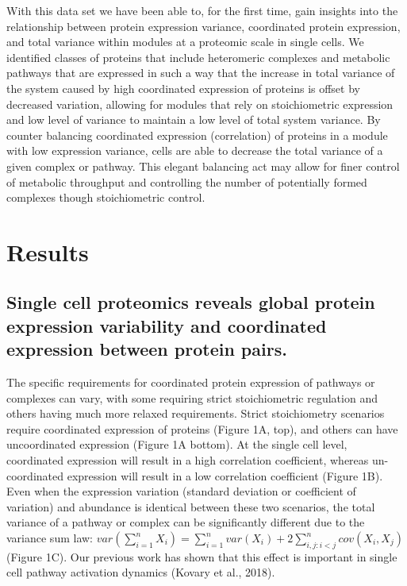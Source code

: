\documentclass[11pt,]{article}
\begin{document}
With this data set we have been able to, for the first time, gain
insights into the relationship between protein expression variance,
coordinated protein expression, and total variance within modules at a
proteomic scale in single cells. We identified classes of proteins that
include heteromeric complexes and metabolic pathways that are expressed
in such a way that the increase in total variance of the system caused
by high coordinated expression of proteins is offset by decreased
variation, allowing for modules that rely on stoichiometric expression
and low level of variance to maintain a low level of total system
variance. By counter balancing coordinated expression (correlation) of
proteins in a module with low expression variance, cells are able to
decrease the total variance of a given complex or pathway. This elegant
balancing act may allow for finer control of metabolic throughput and
controlling the number of potentially formed complexes though
stoichiometric control.

\hypertarget{results}{%
\section{Results}\label{results}}

\hypertarget{single-cell-proteomics-reveals-global-protein-expression-variability-and-coordinated-expression-between-protein-pairs.}{%
\subsection{Single cell proteomics reveals global protein expression
variability and coordinated expression between protein
pairs.}\label{single-cell-proteomics-reveals-global-protein-expression-variability-and-coordinated-expression-between-protein-pairs.}}

The specific requirements for coordinated protein expression of pathways
or complexes can vary, with some requiring strict stoichiometric
regulation and others having much more relaxed requirements. Strict
stoichiometry scenarios require coordinated expression of proteins
(Figure 1A, top), and others can have uncoordinated expression (Figure
1A bottom). At the single cell level, coordinated expression will result
in a high correlation coefficient, whereas un-coordinated expression
will result in a low correlation coefficient (Figure 1B). Even when the
expression variation (standard deviation or coefficient of variation)
and abundance is identical between these two scenarios, the total
variance of a pathway or complex can be significantly different due to
the variance sum law:
\(var\left(\sum_{i=1}^n X_{i}\right) = \sum_{i=1}^{n} var(X_{i}) + 2\sum_{i,j:i<j}^{n} cov(X_{i},X_{j})\)
(Figure 1C). Our previous work has shown that this effect is important
in single cell pathway activation dynamics (Kovary et al., 2018).
\end{document}
